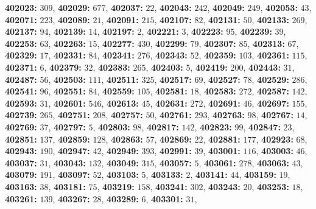 \textsf{\bfseries 402023:} $309$, \textsf{\bfseries 402029:} $677$, \textsf{\bfseries 402037:} $22$, \textsf{\bfseries 402043:} $242$, \textsf{\bfseries 402049:} $249$, \textsf{\bfseries 402053:} $43$, \textsf{\bfseries 402071:} $223$, \textsf{\bfseries 402089:} $21$, \textsf{\bfseries 402091:} $215$, \textsf{\bfseries 402107:} $82$, \textsf{\bfseries 402131:} $50$, \textsf{\bfseries 402133:} $269$, \textsf{\bfseries 402137:} $94$, \textsf{\bfseries 402139:} $14$, \textsf{\bfseries 402197:} $2$, \textsf{\bfseries 402221:} $3$, \textsf{\bfseries 402223:} $95$, \textsf{\bfseries 402239:} $39$, \textsf{\bfseries 402253:} $63$, \textsf{\bfseries 402263:} $15$, \textsf{\bfseries 402277:} $430$, \textsf{\bfseries 402299:} $79$, \textsf{\bfseries 402307:} $85$, \textsf{\bfseries 402313:} $67$, \textsf{\bfseries 402329:} $17$, \textsf{\bfseries 402331:} $84$, \textsf{\bfseries 402341:} $276$, \textsf{\bfseries 402343:} $52$, \textsf{\bfseries 402359:} $103$, \textsf{\bfseries 402361:} $115$, \textsf{\bfseries 402371:} $6$, \textsf{\bfseries 402379:} $32$, \textsf{\bfseries 402383:} $265$, \textsf{\bfseries 402403:} $5$, \textsf{\bfseries 402419:} $200$, \textsf{\bfseries 402443:} $31$, \textsf{\bfseries 402487:} $56$, \textsf{\bfseries 402503:} $111$, \textsf{\bfseries 402511:} $325$, \textsf{\bfseries 402517:} $69$, \textsf{\bfseries 402527:} $78$, \textsf{\bfseries 402529:} $286$, \textsf{\bfseries 402541:} $96$, \textsf{\bfseries 402551:} $84$, \textsf{\bfseries 402559:} $105$, \textsf{\bfseries 402581:} $18$, \textsf{\bfseries 402583:} $272$, \textsf{\bfseries 402587:} $142$, \textsf{\bfseries 402593:} $31$, \textsf{\bfseries 402601:} $546$, \textsf{\bfseries 402613:} $45$, \textsf{\bfseries 402631:} $272$, \textsf{\bfseries 402691:} $46$, \textsf{\bfseries 402697:} $155$, \textsf{\bfseries 402739:} $265$, \textsf{\bfseries 402751:} $208$, \textsf{\bfseries 402757:} $50$, \textsf{\bfseries 402761:} $293$, \textsf{\bfseries 402763:} $98$, \textsf{\bfseries 402767:} $14$, \textsf{\bfseries 402769:} $37$, \textsf{\bfseries 402797:} $5$, \textsf{\bfseries 402803:} $98$, \textsf{\bfseries 402817:} $142$, \textsf{\bfseries 402823:} $99$, \textsf{\bfseries 402847:} $23$, \textsf{\bfseries 402851:} $137$, \textsf{\bfseries 402859:} $128$, \textsf{\bfseries 402863:} $57$, \textsf{\bfseries 402869:} $22$, \textsf{\bfseries 402881:} $177$, \textsf{\bfseries 402923:} $68$, \textsf{\bfseries 402943:} $190$, \textsf{\bfseries 402947:} $42$, \textsf{\bfseries 402949:} $393$, \textsf{\bfseries 402991:} $39$, \textsf{\bfseries 403001:} $116$, \textsf{\bfseries 403003:} $46$, \textsf{\bfseries 403037:} $31$, \textsf{\bfseries 403043:} $132$, \textsf{\bfseries 403049:} $315$, \textsf{\bfseries 403057:} $5$, \textsf{\bfseries 403061:} $278$, \textsf{\bfseries 403063:} $43$, \textsf{\bfseries 403079:} $191$, \textsf{\bfseries 403097:} $52$, \textsf{\bfseries 403103:} $5$, \textsf{\bfseries 403133:} $2$, \textsf{\bfseries 403141:} $44$, \textsf{\bfseries 403159:} $19$, \textsf{\bfseries 403163:} $38$, \textsf{\bfseries 403181:} $75$, \textsf{\bfseries 403219:} $158$, \textsf{\bfseries 403241:} $302$, \textsf{\bfseries 403243:} $20$, \textsf{\bfseries 403253:} $18$, \textsf{\bfseries 403261:} $139$, \textsf{\bfseries 403267:} $28$, \textsf{\bfseries 403289:} $6$, \textsf{\bfseries 403301:} $31$, 

